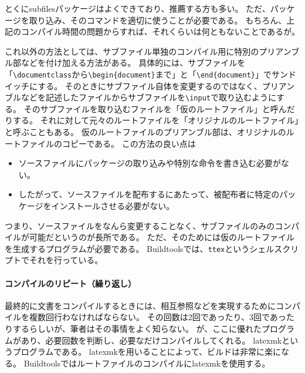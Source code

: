 とくにsubfilesパッケージはよくできており、推薦する方も多い。
ただ、パッケージを取り込み、そのコマンドを適切に使うことが必要である。
もちろん、上記のコンパイル時間の問題からすれば、それくらいは何ともないことであるが。

これ以外の方法としては、サブファイル単独のコンパイル用に特別のプリアンブル部などを付け加える方法がある。
具体的には、サブファイルを「\texttt{\textbackslash{}documentclass}から\texttt{\textbackslash{}begin\{document\}}まで」と「\texttt{\textbackslash{}end\{document\}}」でサンドイッチにする。
そのときにサブファイル自体を変更するのではなく、プリアンブルなどを記述したファイルからサブファイルを\texttt{\textbackslash{}input}で取り込むようにする。
そのサブファイルを取り込むファイルを「仮のルートファイル」と呼んだりする。
それに対して元々のルートファイルを「オリジナルのルートファイル」と呼ぶこともある。
仮のルートファイルのプリアンブル部は、オリジナルのルートファイルのコピーである。
この方法の良い点は

\begin{itemize}
\tightlist
\item
  ソースファイルにパッケージの取り込みや特別な命令を書き込む必要がない。
\item
  したがって、ソースファイルを配布するにあたって、被配布者に特定のパッケージをインストールさせる必要がない。
\end{itemize}

つまり、ソースファイルをなんら変更することなく、サブファイルのみのコンパイルが可能だというのが長所である。
ただ、そのためには仮のルートファイルを生成するプログラムが必要である。
Buildtoolsでは、\texttt{ttex}というシェルスクリプトでそれを行っている。

\hypertarget{ux30b3ux30f3ux30d1ux30a4ux30ebux306eux30eaux30d4ux30fcux30c8ux7e70ux308aux8fd4ux3057}{%
\paragraph{コンパイルのリピート（繰り返し）}\label{ux30b3ux30f3ux30d1ux30a4ux30ebux306eux30eaux30d4ux30fcux30c8ux7e70ux308aux8fd4ux3057}}

最終的に文書をコンパイルするときには、相互参照などを実現するためにコンパイルを複数回行わなければならない。
その回数は2回であったり、3回であったりするらしいが、筆者はその事情をよく知らない。
が、ここに優れたプログラムがあり、必要回数を判断し、必要なだけコンパイルしてくれる。
latexmkというプログラムである。
latexmkを用いることによって、ビルドは非常に楽になる。
Buildtoolsではルートファイルのコンパイルにlatexmkを使用する。


